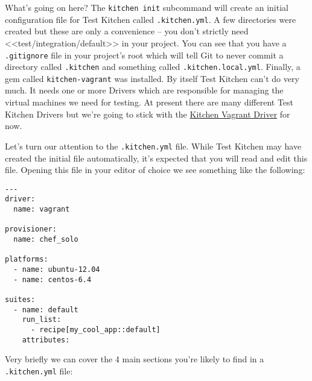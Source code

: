 What's going on here? The \lstinline!kitchen init! subcommand will create an initial configuration file for Test Kitchen called \lstinline!.kitchen.yml!. A few directories were created but these are only a convenience – you don't strictly need <<test/integration/default>> in your project. You can see that you have a \lstinline!.gitignore! file in your project's root which will tell Git to never commit a directory called \lstinline!.kitchen! and something called \lstinline!.kitchen.local.yml!. Finally, a gem called \lstinline!kitchen-vagrant! was installed. By itself Test Kitchen can't do very much. It needs one or more Drivers which are responsible for managing the virtual machines we need for testing. At present there are many different Test Kitchen Drivers but we're going to stick with the \href{https://github.com/opscode/kitchen-vagrant}{Kitchen Vagrant Driver} for now.

Let's turn our attention to the \lstinline!.kitchen.yml! file. While Test Kitchen may have created the initial file automatically, it's expected that you will read and edit this file. Opening this file in your editor of choice we see something like the following:

\begin{lstlisting}[label=lst:testing-test-kitchen4]
---
driver:
  name: vagrant

provisioner:
  name: chef_solo

platforms:
  - name: ubuntu-12.04
  - name: centos-6.4

suites:
  - name: default
    run_list:
      - recipe[my_cool_app::default]
    attributes:
\end{lstlisting}

Very briefly we can cover the 4 main sections you're likely to find in a \lstinline!.kitchen.yml! file:

